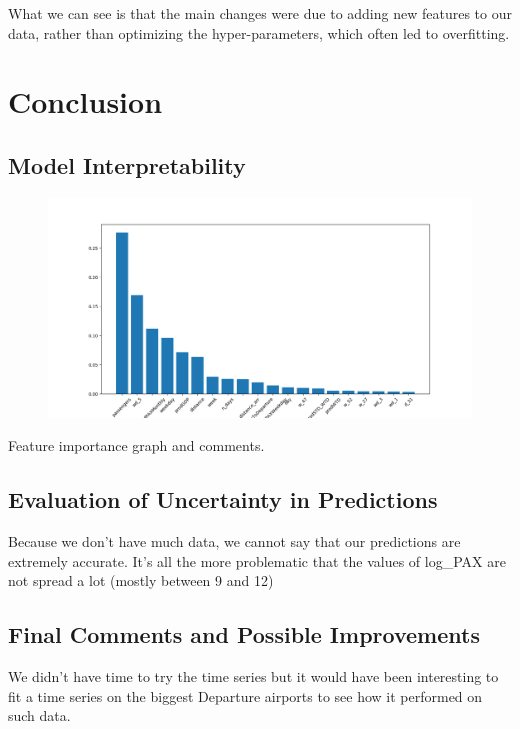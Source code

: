 \documentclass[a4paper,12pt,twoside]{article}
\begin{document}
What we can see is that the main changes were due to adding new features to our data, rather than optimizing the hyper-parameters, which often led to overfitting.

\section{Conclusion}

\subsection{Model Interpretability}

\begin{figure}[H]
	\centering
	\includegraphics[scale=0.5]{feature_importance.png}
\end{figure}

Feature importance graph and comments.

\subsection{Evaluation of Uncertainty in Predictions}

Because we don't have much data, we cannot say that our predictions are extremely accurate. It's all the more problematic that the values of log\_PAX are not spread a lot (mostly between 9 and 12)

\subsection{Final Comments and Possible Improvements}

We didn't have time to try the time series but it would have been interesting to fit a time series on the biggest Departure airports to see how it performed on such data.
\end{document}
